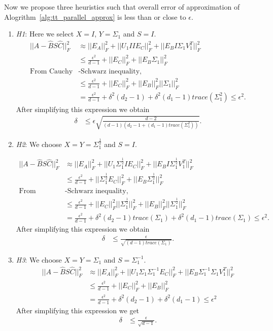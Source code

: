 \documentclass[runningheads]{llncs}
\begin{document}
\noindent Now we propose three heuristics such that overall error of approximation of Alogrithm~\ref{alg:tt_parallel_approx} is less than or close to $\epsilon$.
\begin{enumerate}
	\item \textit{H1}: Here we select $X = I$, $Y = \Sigma_1$ and $S = I$.	
	\begin{align*}
	||A - \hat{B} S \hat{C}||_F^2 &\approx ||E_A||_F^2 + ||U_1IIE_C||_F^2 + ||E_BI\Sigma_1V_1^T||_F^2 \\
	&\le \frac{\epsilon^2}{d-1} + ||E_C||_F^2 + ||E_B\Sigma_1||_F^2 \\
	\text{From Cauchy} & \text{-Schwarz inequality,}\\
	&\le \frac{\epsilon^2}{d-1} + ||E_C||_F^2 + ||E_B||_F^2 ||\Sigma_1||_F^2 \\
	&= \frac{\epsilon^2}{d-1} + \delta^2 (d_2-1)+ \delta^2 (d_1-1) trace(\Sigma_1^2)\le \epsilon^2.
	\end{align*}
	\noindent After simplifying this expression we obtain
	\begin{align*}
	\delta &\le \epsilon \sqrt{\frac{d-2}{(d-1) (d_2 -1 + (d_1-1) trace(\Sigma_1^2))}}.
	\end{align*}
	
	\item \textit{H2}: We choose $X=Y=\Sigma_1^{\frac{1}{2}}$ and $S=I$.
	
	\begin{align*}
	||A - \hat{B} S \hat{C}||_F^2 &\approx ||E_A||_F^2 + ||U_1 \Sigma_1^{\frac{1}{2}} IE_C||_F^2 + ||E_B I \Sigma_1^{\frac{1}{2}} V_1^T||_F^2 \\
	&\le \frac{\epsilon^2}{d-1} + ||\Sigma_1^{\frac{1}{2}} E_C||_F^2 + ||E_B \Sigma_1^{\frac{1}{2}}||_F^2 \\
	\text{From Cauchy} & \text{-Schwarz inequality,}\\
	&\le \frac{\epsilon^2}{d-1} + ||E_C||_F^2 ||\Sigma_1^{\frac{1}{2}}||_F^2 + ||E_B||_F^2 ||\Sigma_1^{\frac{1}{2}}||_F^2 \\
	&= \frac{\epsilon^2}{d-1} + \delta^2 (d_2-1) trace(\Sigma_1) + \delta^2 (d_1 -1) trace(\Sigma_1)\le \epsilon^2.
	\end{align*} 
	\noindent After simplifying this expression we obtain
	\begin{align*}
	\delta &\le \frac{\epsilon}{\sqrt{(d-1)trace(\Sigma_1)}}.
	\end{align*}
	
	\item \textit{H3}: We choose $X=Y=\Sigma_1$ and $S=\Sigma_1^{-1}$.
	\begin{align*}
	||A - \hat{B} S \hat{C}||_F^2 &\approx ||E_A||_F^2 + ||U_1\Sigma_1 \Sigma_1^{-1} E_C||_F^2 + ||E_B \Sigma_1^{-1} \Sigma_1 V_1^T||_F^2\\
	&\le \frac{\epsilon^2}{d-1} + ||E_C||_F^2 + ||E_B||_F^2 \\
	&= \frac{\epsilon^2}{d-1} + \delta^2 (d_2 -1) + \delta^2 (d_1-1) \le \epsilon^2
	\end{align*}
	\noindent After simplifying this expression we get
	\begin{align*}
	\delta &\le \frac{\epsilon}{\sqrt{d-1}}.
	\end{align*}	
\end{enumerate}
\end{document}
